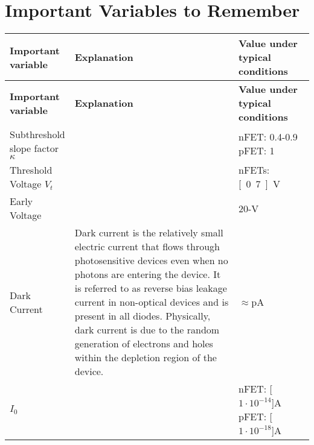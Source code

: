 \documentclass[main]{subfiles}
\begin{document}
\section{Important Variables to Remember}


\renewcommand{\arraystretch}{1.5}

\begin{longtable}{p{0.2\linewidth} p{0.55\linewidth} p{0.25\linewidth}}
\hline \textbf{Important variable} & \textbf{Explanation} & \textbf{Value under typical conditions}\\ \hline\hline
\endfirsthead

\hline \textbf{Important variable} & \textbf{Explanation} & \textbf{Value under typical conditions}\\ \hline\hline
\endhead

Subthreshold slope factor $\kappa$ & & nFET: 0.4-0.9 \newline pFET: 1\\
Threshold Voltage $V_t$ & & nFETs: \unit[0.7]{V}\\
Early Voltage & & 20-\unit[30]{V}\\
Dark Current & Dark current is the relatively small electric current that flows through photosensitive devices even when no photons are entering the device. It is referred to as reverse bias leakage current in non-optical devices and is present in all diodes. Physically, dark current is due to the random generation of electrons and holes within the depletion region of the device.& $\approx$\unit[1-10]{pA}\\
$I_0$ & & nFET: \unit[$1\cdot10^{-14}$]{A} \newline pFET: \unit[$1\cdot10^{-18}$]{A}\\
\end{longtable}

\end{document}
